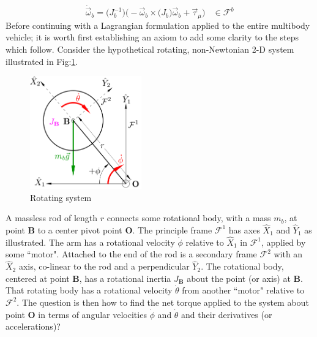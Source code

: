 \begin{equation}
\dot{\vec{\omega}}_b=\big(J_b^{-1}\big)\Big(-\vec{\omega}_b\times\big(J_b\big)\vec{\omega}_b+\vec{\tau}_{\mu}\Big)~~~~\in\mathcal{F}^b
\end{equation}
Before continuing with a Lagrangian formulation applied to the entire multibody vehicle; it is worth first establishing an axiom to add some clarity to the steps which follow. Consider the hypothetical rotating, non-Newtonian 2-D system illustrated in Fig:\ref{fig:lemma-1}. 
\begin{figure}[htbp]
\centering
\includegraphics[width=0.43\textwidth]{figs/lemma-1}
\vspace{-6pt}
\caption{Rotating system}
\label{fig:lemma-1}
\vspace{-18pt}
\end{figure} 
\par
A massless rod of length $r$ connects some rotational body, with a mass $m_b$, at point $\mathbf{B}$ to a center pivot point $\mathbf{O}$. The principle frame $\mathcal{F}^{1}$ has axes $\hat{X}_1$ and $\hat{Y}_1$ as illustrated. The arm has a rotational velocity $\dot{\phi}$ relative to $\hat{X}_1$ in $\mathcal{F}^{1}$, applied by some ``motor". Attached to the end of the rod is a secondary frame $\mathcal{F}^2$ with an $\hat{X}_2$ axis, co-linear to the rod and a perpendicular $\hat{Y}_2$. The rotational body, centered at point $\mathbf{B}$, has a rotational inertia $J_\mathbf{B}$ about the point (or axis) at $\mathbf{B}$. That rotating body has a rotational velocity $\dot{\theta}$ from another ``motor" relative to $\mathcal{F}^2$. The question is then how to find the net torque applied to the system about point $\mathbf{O}$ in terms of angular velocities $\dot{\phi}$ and $\dot{\theta}$ and their derivatives (or accelerations)?
